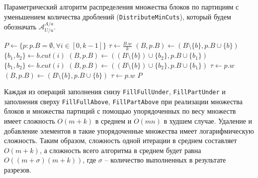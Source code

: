 \newpage
\begin{algo}\label{alg:par_distr_mincuts}
Параметрический алгоритм распределения множества блоков по партициям с уменьшением количества дроблений (\texttt{DistributeMinCuts}), который будем обозначать $\mathscr{A}_{U/u}^{A/a}$.
\begin{algorithm}
\DontPrintSemicolon
{}
{
	$P \leftarrow \{ p : p.B = \emptyset, \forall i \in [0, k - 1] \}$\;
	$\tau \leftarrow \frac{B.w}{k}$\;
	{
		{
			$(B, p.B) \leftarrow (B \setminus \{b\}, p.B \cup \{b\})$\;
			\Continue\;
		}
		{
			$\{ b_1, b_2 \} \leftarrow b.cut(i)$\;
			$(B, p.B) \leftarrow ((B \setminus \{ b \}) \cup \{ b_2 \}, p.B \cup \{ b_1 \})$\;
			\Continue\;
		}
		{
			$\{ b_1, b_2 \} \leftarrow b.cut(i)$\;
			$(B, p.B) \leftarrow ((B \setminus \{ b \}) \cup \{ b_2 \}, p.B \cup \{ b_1 \})$\;
			$\tau \leftarrow p.w$\;
			\Continue\;
		}
		{
			$(B, p.B) \leftarrow (B \setminus \{b\}, p.B \cup \{b\})$\;
			$\tau \leftarrow p.w$\;
			\Continue\;
		}
	}
	\KwRet $P$\;
}
\end{algorithm}
\end{algo}

Каждая из операций заполнения снизу \texttt{FillFullUnder}, \texttt{FillPartUnder} и заполнения сверху \texttt{FillFullAbove}, \texttt{FillPartAbove} при реализации множества блоков и множества партиций с помощью упорядоченных по весу множеств имеет сложность $O(m + k)$ в среднем и $O(mn)$ в худшем случае.
Удаление и добавление элементов в такие упорядоченные множества имеет логарифмическую сложность.
Таким образом, сложность одной итерации в среднем составляет $O(m + k)$, а сложность всего алгоритма в среднем будет равна $O((m + \sigma)(m + k))$, где $\sigma$ -- количество выполненных в результате разрезов.


